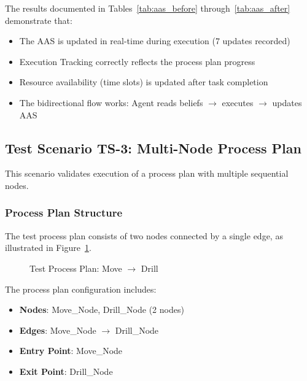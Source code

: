 The results documented in Tables~\ref{tab:aas_before} through~\ref{tab:aas_after} demonstrate that:
\begin{itemize}
    \item The \ac{AAS} is updated in real-time during execution (7 updates recorded)
    \item Execution Tracking correctly reflects the process plan progress
    \item Resource availability (time slots) is updated after task completion
    \item The bidirectional flow works: Agent reads beliefs $\rightarrow$ executes $\rightarrow$ updates \ac{AAS}
\end{itemize}

\subsection{Test Scenario TS-3: Multi-Node Process Plan}
\label{subsec:ts3_process_plan}

This scenario validates execution of a process plan with multiple sequential nodes.

\subsubsection{Process Plan Structure}

The test process plan consists of two nodes connected by a single edge, as illustrated in Figure~\ref{fig:test_process_plan}.

\begin{figure}[ht]
\centering
{}
\caption{Test Process Plan: Move $\rightarrow$ Drill}
\label{fig:test_process_plan}
\end{figure}

The process plan configuration includes:
\begin{itemize}
    \item \textbf{Nodes}: Move\_Node, Drill\_Node (2 nodes)
    \item \textbf{Edges}: Move\_Node $\rightarrow$ Drill\_Node
    \item \textbf{Entry Point}: Move\_Node
    \item \textbf{Exit Point}: Drill\_Node
\end{itemize}

